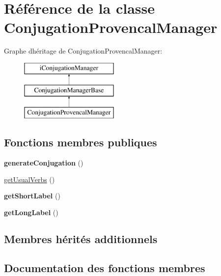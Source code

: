 \hypertarget{classConjugationProvencalManager}{}\section{Référence de la classe Conjugation\+Provencal\+Manager}
\label{classConjugationProvencalManager}
Graphe d\textquotesingle{}héritage de Conjugation\+Provencal\+Manager\+:\begin{figure}[H]
\begin{center}
\leavevmode
\includegraphics[height=3.000000cm]{classConjugationProvencalManager}
\end{center}
\end{figure}
\subsection*{Fonctions membres publiques}
\begin{DoxyCompactItemize}
\item 
\hypertarget{classConjugationProvencalManager_ab63e44b281c68e841becec69bf3abf5d}{}\label{classConjugationProvencalManager_ab63e44b281c68e841becec69bf3abf5d} 
{\bfseries generate\+Conjugation} ()
\item 
\hyperlink{classConjugationProvencalManager_ab54b1aaa7e39d3f31d416640322eae5a}{get\+Usual\+Verbs} ()
\item 
\hypertarget{classConjugationProvencalManager_acfdf3d08b4e9787cd9fac2e9eea042ba}{}\label{classConjugationProvencalManager_acfdf3d08b4e9787cd9fac2e9eea042ba} 
{\bfseries get\+Short\+Label} ()
\item 
\hypertarget{classConjugationProvencalManager_a9795549adf0ba2f9bded882cf85c792c}{}\label{classConjugationProvencalManager_a9795549adf0ba2f9bded882cf85c792c} 
{\bfseries get\+Long\+Label} ()
\end{DoxyCompactItemize}
\subsection*{Membres hérités additionnels}


\subsection{Documentation des fonctions membres}
\hypertarget{classConjugationProvencalManager_ab54b1aaa7e39d3f31d416640322eae5a}{}\label{classConjugationProvencalManager_ab54b1aaa7e39d3f31d416640322eae5a} 
